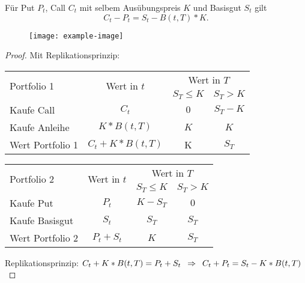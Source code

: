 \begin{lemma} %
	Für Put $P_t$, Call $C_t$ mit selbem Ausübungspreis $K$ und Basisgut $S_t$ gilt
	\begin{equation*}
		C_t - P_t = S_t - B(t,T) * K .
	\end{equation*}
\end{lemma}
\begin{figure}
	\centering
	\texttt{[image: example-image]}
\end{figure}
\begin{proof}
	Mit Replikationsprinzip:
	
	\begin{center}
		\begin{tabular}{|l|c|cc|}
			\hline 
			\multirow{2}{*}{Portfolio 1} & \multirow{2}{*}{Wert in $t$} & \multicolumn{2}{c|}{Wert in $T$} \\
			&& $S_T \le K$ & $S_T > K$ \\ \hline \hline
			Kaufe Call & $C_t$ & $0$ & $S_T - K$ \\
			Kaufe Anleihe & $K * B(t,T)$ & $K$ & $K$ \\ \hline
			Wert Portfolio 1 & $C_t + K * B(t,T)$ & K & $S_T$ \\ 
			\hline
		\end{tabular}
	\end{center}

	\begin{center}
		\begin{tabular}{|l|c|cc|}
			\hline 
			\multirow{2}{*}{Portfolio 2} & \multirow{2}{*}{Wert in $t$} & \multicolumn{2}{c|}{Wert in $T$} \\
			&& $S_T \le K$ & $S_T > K$ \\ \hline \hline
			Kaufe Put & $P_t$ & $K - S_T$ & $0$ \\
			Kaufe Basisgut & $S_t$ & $S_T$ & $S_T$ \\ \hline
			Wert Portfolio 2 & $P_t + S_t$ & $K$ & $S_T$ \\ 
			\hline
		\end{tabular}
	\end{center}

	Replikationsprinzip: $C_t + K * B(t,T) = P_t + S_t \enskip \Rightarrow \enskip C_t + P_t = S_t - K*B(t,T)$
\end{proof}

